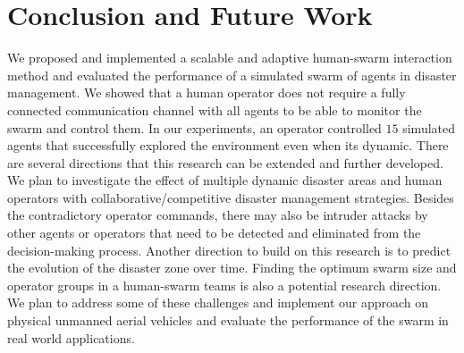 \documentclass[runningheads]{llncs}%
\begin{document}
\section{Conclusion and Future Work}
\label{sec:conclusion}
We proposed and implemented a scalable and adaptive human-swarm interaction method and evaluated the performance of a simulated swarm of agents in disaster management. We showed that a human operator does not require a fully connected communication channel with all agents to be able to monitor the swarm and control them. In our experiments, an operator controlled $15$ simulated agents that successfully explored the environment even when its dynamic. There are several directions that this research can be extended and further developed. We plan to investigate the effect of multiple dynamic disaster areas and human operators with collaborative/competitive disaster management strategies. Besides the contradictory operator commands, there may also be intruder attacks by other agents or operators that need to be detected and eliminated from the decision-making process. Another direction to build on this research is to predict the evolution of the disaster zone over time. Finding the optimum swarm size and operator groups in a human-swarm teams is also a potential research direction. We plan to address some of these challenges and implement our approach on physical unmanned aerial vehicles and evaluate the performance of the swarm in real world applications. 



\end{document}
